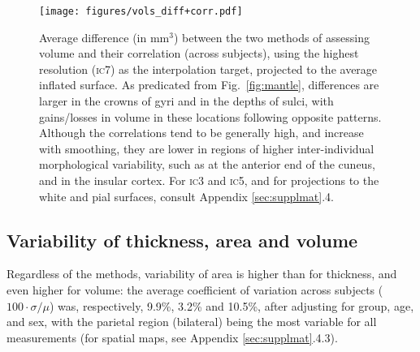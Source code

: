 \begin{figure}[!p]
\begin{center}
\texttt{[image: figures/vols\_diff+corr.pdf]}
\end{center}
\caption[Average difference and correlation between the two methods of assessing volume.]{Average difference (in mm$^3$) between the two methods of assessing volume and their correlation (across subjects), using the highest resolution (\textsc{ic}7) as the interpolation target, projected to the average inflated surface. As predicated from Fig.~\ref{fig:mantle}, differences are larger in the crowns of gyri and in the depths of sulci, with gains/losses in volume in these locations following opposite patterns. Although the correlations tend to be generally high, and increase with smoothing, they are lower in regions of higher inter-individual morphological variability, such as at the anterior end of the cuneus, and in the insular cortex. For \textsc{ic}3 and \textsc{ic5}, and for projections to the white and pial surfaces, consult Appendix \ref{sec:supplmat}.4.}
\label{fig:maps_vols}
\end{figure}

\subsection{Variability of thickness, area and volume}

Regardless of the methods, variability of area is higher than for thickness, and even higher for volume: the average coefficient of variation across subjects ($100\cdot\sigma/\mu$) was, respectively, 9.9\%, 3.2\% and 10.5\%, after adjusting for group, age, and sex, with the parietal region (bilateral) being the most variable for all measurements (for spatial maps, see Appendix \ref{sec:supplmat}.4.3).

\begin{figure}[!p]
\end{figure}


